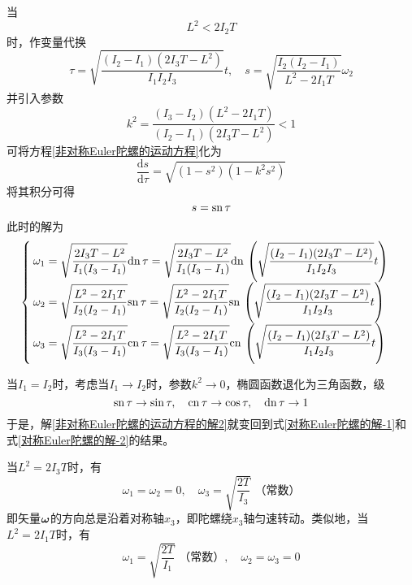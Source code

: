 当
\begin{equation*}
	L^2<2I_2T
\end{equation*}
时，作变量代换
\begin{equation}
	\tau = \sqrt{\frac{(I_2-I_1)(2I_3T-L^2)}{I_1I_2I_3}}t,\quad s = \sqrt{\frac{I_2(I_2-I_1)}{L^2-2I_1T}}\omega_2
\end{equation}
并引入参数
\begin{equation}
	k^2 = \frac{(I_3-I_2)(L^2-2I_1T)}{(I_2-I_1)(2I_3T-L^2)}<1
\end{equation}
可将方程\eqref{非对称Euler陀螺的运动方程}化为
\begin{equation*}
	\frac{\mathrm{d}s}{\mathrm{d}\tau} = \sqrt{(1-s^2)(1-k^2s^2)}
\end{equation*}
将其积分可得
\begin{equation*}
	s = \mathrm{sn}\, \tau
\end{equation*}
此时的解为
\begin{equation}
\begin{cases}
	\displaystyle \omega_1 = \sqrt{\frac{2I_3T-L^2}{I_1(I_3-I_1)}}\mathrm{dn}\, \tau = \sqrt{\frac{2I_3T-L^2}{I_1(I_3-I_1)}}\mathrm{dn}\, \left(\sqrt{\frac{(I_2-I_1)(2I_3T-L^2)}{I_1I_2I_3}}t\right) \\
	\displaystyle \omega_2 = \sqrt{\frac{L^2-2I_1T}{I_2(I_2-I_1)}}\mathrm{sn}\, \tau = \sqrt{\frac{L^2-2I_1T}{I_2(I_2-I_1)}}\mathrm{sn}\, \left(\sqrt{\frac{(I_2-I_1)(2I_3T-L^2)}{I_1I_2I_3}}t\right) \\
	\displaystyle \omega_3 = \sqrt{\frac{L^2-2I_1T}{I_3(I_3-I_1)}}\mathrm{cn}\, \tau = \sqrt{\frac{L^2-2I_1T}{I_3(I_3-I_1)}}\mathrm{cn}\, \left(\sqrt{\frac{(I_2-I_1)(2I_3T-L^2)}{I_1I_2I_3}}t\right)
\end{cases}
\label{非对称Euler陀螺的运动方程的解3}
\end{equation}

当$I_1=I_2$时，考虑当$I_1\to I_2$时，参数$k^2\to 0$，椭圆函数退化为三角函数，级
\begin{equation*}
	\mathrm{sn}\, \tau \to \sin \tau,\quad \mathrm{cn}\,\tau \to \cos \tau,\quad \mathrm{dn}\, \tau \to 1
\end{equation*}
于是，解\eqref{非对称Euler陀螺的运动方程的解2}就变回到式\eqref{对称Euler陀螺的解-1}和式\eqref{对称Euler陀螺的解-2}的结果。

当$L^2=2I_3T$时，有
\begin{equation*}
	\omega_1 = \omega_2 = 0,\quad \omega_3 = \sqrt{\frac{2T}{I_3}}\,\,\text{（常数）}
\end{equation*}
即矢量$\boldsymbol{\omega}$的方向总是沿着对称轴$x_3$，即陀螺绕$x_3$轴匀速转动。类似地，当$L^2=2I_1T$时，有
\begin{equation*}
	\omega_1 = \sqrt{\frac{2T}{I_1}}\,\,\text{（常数）},\quad \omega_2 = \omega_3 = 0
\end{equation*}

